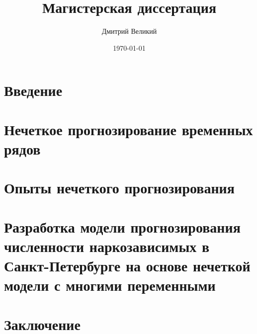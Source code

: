 \documentclass[a4paper,14pt]{report}
\author{Дмитрий Великий}
\title{Магистерская диссертация}
\date{\today}
\begin{document}

\tableofcontents
\chapter*{Введение}

\chapter{Нечеткое прогнозирование временных рядов}

\chapter{Опыты нечеткого прогнозирования}

\chapter{Разработка модели прогнозирования численности наркозависимых в 
Санкт-Петербурге на основе нечеткой модели с многими переменными}

\chapter*{Заключение}

\newpage
\printbibliography[heading=bibintoc]
\end{document}

